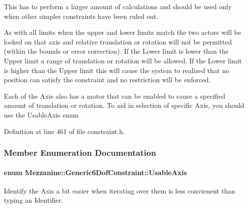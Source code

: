 This has to perform a larger amount of calculations and should be used only when other simpler constraints have been ruled out. \par
 \par
 As with all limits when the upper and lower limits match the two actors will be locked on that axis and relative translation or rotation will not be permitted (within the bounds or error correction). If the Lower limit is lower than the Upper limit a range of translation or rotation will be allowed. If the Lower limit is higher than the Upper limit this will cause the system to realized that no position can satisfy the constraint and no restriction will be enforced. \par
 \par
 Each of the Axis also has a motor that can be enabled to cause a specified amount of translation or rotation. To aid in selection of specific Axis, you should use the UsableAxis enum 

Definition at line 461 of file constraint.h.



\subsubsection{Member Enumeration Documentation}
\hypertarget{classMezzanine_1_1Generic6DofConstraint_ac00067026a7d4e7c6832f169c754d585}{
\paragraph[{UsableAxis}]{\setlength{\rightskip}{0pt plus 5cm}enum {\bf Mezzanine::Generic6DofConstraint::UsableAxis}}\hfill}
\label{classMezzanine_1_1Generic6DofConstraint_ac00067026a7d4e7c6832f169c754d585}


Identify the Axis a bit easier when iterating over them is less convienent than typing an Identifier. 


